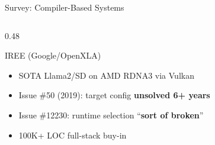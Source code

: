 \documentclass[aspectratio=169,10pt]{beamer}
\begin{document}
\begin{frame}{Survey: Compiler-Based Systems}
\begin{columns}[T]
\begin{column}{0.48\textwidth}
\begin{block}{IREE (Google/OpenXLA)}
\begin{itemize}
          \item SOTA Llama2/SD on AMD RDNA3 via Vulkan
          \item Issue \#50 (2019): target config \textbf{unsolved 6+ years}
          \item Issue \#12230: runtime selection ``\textbf{sort of broken}''
          \item \textcolor{codered}{100K+ LOC full-stack buy-in}
        \end{itemize}
      \end{block}
    \end{column}
  \end{columns}
\end{frame}

\end{document}
